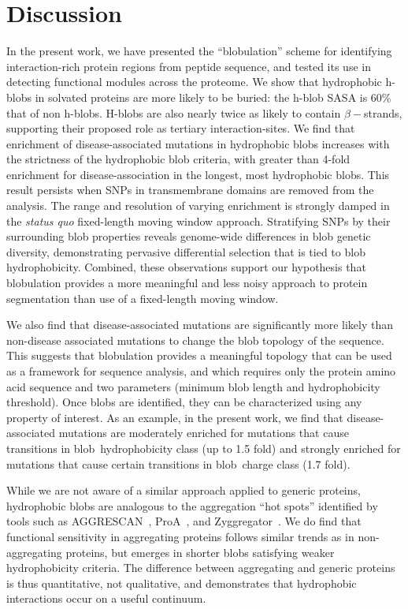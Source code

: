 \documentclass[9pt,twocolumn,twoside,lineno]{pnas-new}
\newcommand{\hydrochar}{hydrophobicity class}
\newcommand{\chargechar}{charge class}
\begin{document}
\section*{Discussion}
In the present work, we have presented the ``blobulation'' scheme for identifying interaction-rich protein regions from peptide sequence, and tested its use in detecting functional modules across the proteome. We show that hydrophobic h-blobs in solvated proteins are more likely to be buried: the h-blob SASA is 60\% that of non h-blobs. H-blobs are also nearly twice as likely to contain $\beta-$strands, supporting their proposed role as tertiary interaction-sites. We find that enrichment of disease-associated mutations in hydrophobic blobs increases with the strictness of the hydrophobic blob criteria, with greater than 4-fold enrichment for disease-association in the longest, most hydrophobic blobs. This result persists when SNPs in transmembrane domains are removed from the analysis. The range and resolution of varying enrichment is strongly damped in the {\it status quo} fixed-length moving window approach. Stratifying SNPs by their surrounding blob properties reveals genome-wide differences in blob genetic diversity, demonstrating pervasive differential selection that is tied to blob hydrophobicity. 
Combined, these observations support our hypothesis that blobulation provides a more meaningful and less noisy approach to protein segmentation than use of a fixed-length moving window.

We also find that disease-associated mutations are significantly more likely than non-disease associated mutations to change the blob topology of the sequence.  This suggests that blobulation provides a meaningful topology that can be used as a framework for sequence analysis, and which requires only the protein amino acid sequence and two parameters (minimum blob length and hydrophobicity threshold). Once blobs are identified, they can be characterized using any property of interest. As an example, in the present work, we find that disease-associated mutations are moderately enriched for mutations that cause transitions in blob~\hydrochar{} (up to 1.5 fold) and strongly enriched for mutations that cause certain transitions in blob~\chargechar{} (1.7 fold).

While we are not aware of a similar approach applied to generic proteins, hydrophobic blobs are analogous to the aggregation ``hot spots'' identified by tools such as AGGRESCAN~\citep{ConchilloSole2007}, ProA~\citep{Fang2013}, and Zyggregator~\citep{Tartaglia2008}. 
We do find that functional sensitivity in aggregating proteins follows similar trends as in non-aggregating proteins, but emerges in shorter blobs satisfying weaker hydrophobicity criteria. The difference between aggregating and generic proteins is thus quantitative, not qualitative, and demonstrates that hydrophobic interactions occur on a useful continuum. 
\end{document}
